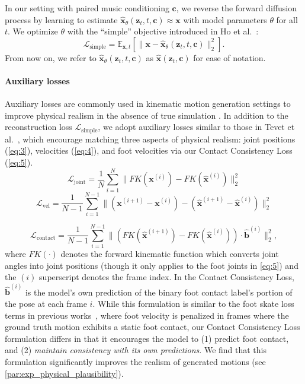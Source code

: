 \documentclass[10pt,twocolumn,letterpaper]{article}
\begin{document}
In our setting with paired music conditioning $\bm{c}$, we reverse the forward diffusion process by learning to estimate $\bm{\hat{x}}_\theta(\bm{z}_t, t, \bm{c}) \approx \bm{x}$ with model parameters $\theta$ for all $t$.
We optimize $\theta$ with the ``simple'' objective introduced in Ho et al.~\cite{ho2020denoising}:
\begin{equation} \label{eq:2}
{
\mathcal{L}_\text{simple} = \mathbb{E}_{\bm{x}, t}\left[\| \bm{x} - \bm{\hat{x}}_\theta(\bm{z}_t, t, \bm{c})\|_2^2\right].
}
\end{equation}
From now on, we refer to $\bm{\hat{x}}_\theta(\bm{z}_t, t, \bm{c})$ as $\bm{\hat{x}}(\bm{z}_t,\bm{c})$ for ease of notation.

\paragraph{Auxiliary losses} 
Auxiliary losses are commonly used in kinematic motion generation settings to improve physical realism in the absence of true simulation \cite{tang2022real, shi2020motionet, petrovich2021action}.
In addition to the reconstruction loss $\mathcal{L}_\text{simple}$, we adopt auxiliary losses similar to those in Tevet et al.~\cite{tevet2022human}, which encourage matching three aspects of physical realism: joint positions (\cref{eq:3}), velocities (\cref{eq:4}), and foot velocities via our Contact Consistency Loss (\cref{eq:5}).
\begin{equation} \label{eq:3}
{
\mathcal{L}_\text{joint} = \frac{1}{N} \sum_{i =1}^{N} \| FK(\bm{x}^{(i)}) - FK(\bm{\hat{x}}^{(i)})\|_{2}^{2} %
} 
\end{equation}
\begin{equation} \label{eq:4}
{
\mathcal{L}_\text{vel} = \frac{1}{N-1} \sum_{i =1}^{N-1} \| (\bm{x}^{(i+1)} - \bm{x}^{(i)}) - (\bm{\hat{x}}^{(i+1)} - \bm{\hat{x}}^{(i)})\|_{2}^{2}
}
\end{equation}

\begin{equation} \label{eq:5}
{
\mathcal{L}_\text{contact} = \frac{1}{N-1} \sum_{i =1}^{N-1} \| (FK(\bm{\hat{x}}^{(i+1)}) - FK(\bm{\hat{x}}^{(i)})) \cdot \bm{\hat{b}}^{(i)}\|_{2}^{2}
},
\end{equation}
where $FK(\cdot)$ denotes the forward kinematic function which converts joint angles into joint positions (though it only applies to the foot joints in \cref{eq:5}) and the $(i)$ superscript denotes the frame index.
In the Contact Consistency Loss, $\bm{\hat{b}}^{(i)}$ is the model's own prediction of the binary foot contact label's portion of the pose at each frame $i$.
While this formulation is similar to the foot skate loss terms in previous works~\cite{tevet2022human, tang2022real}, where foot velocity is penalized in frames where the ground truth motion exhibits a static foot contact, our Contact Consistency Loss formulation differs in that it encourages the model to (1) predict foot contact, and (2) \textit{maintain consistency with its own predictions}.
We find that this formulation significantly improves the realism of generated motions (see \cref{par:exp_physical_plausibility}).
\end{document}
